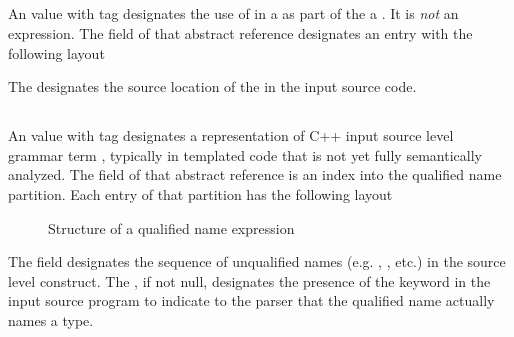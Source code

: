 


\subsection{}
\label{sec:ifc:ExprSort:Pointer}

An  value with tag  designates the use of \code{*} in a 
 as part of the a .  It is \emph{not} an expression.
The  field of that abstract reference designates an entry with the following layout
%
\begin{figure}[H]
	\centering
	\label{fig:ifc-pointer-expr-structure}
\end{figure}
%
The  designates the source location of the \code{*} in the input source code.



\subsection{}
\label{sec:ifc:ExprSort:QualifiedName}

An  value with tag  designates a representation of 
C++ input source level grammar term , typically in templated code that is not
yet fully semantically analyzed.  The  field of that abstract reference is an index into
the qualified name partition.  Each entry of that partition has the following layout
%
\begin{figure}[H]
	\centering
	\caption{Structure of a qualified name expression}
	\label{fig:ifc-qualified-name-structure}
\end{figure}
%
The  field designates the sequence of unqualified names (e.g. , , etc.)
 in the source level construct.  The , if not null, designates the presence of
 the  keyword in the input source program to indicate to the parser that the qualified name actually names a type.

